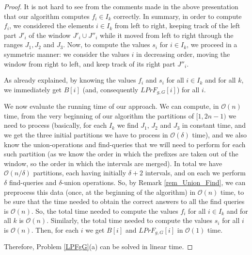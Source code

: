 \documentclass[final]{dmtcs-episciences}
\newcommand{\bigo}{{\mathcal O}}
\newcommand{\LPF}{{\mathit{LPrF}}}
\begin{document}
\begin{proof}
It is not hard to see from the comments made in the above presentation that our algorithm computes $f_i\in I_k$ correctly. In summary, in order to compute $f_i$, we considered the elements $i\in I_k$ from left to right, keeping track of the left part $J'_i$ of the window $J'_i\cup J''_i$ while it moved from left to right through the ranges $J_1,J_2$ and $J_3$. Now, to compute the values $s_i$ for $i\in I_k$, we proceed in a symmetric manner: we consider the values $i$ in decreasing order, moving the window from right to left, and keep track of its right part $J''_i$. 

As already explained, by knowing the values $f_i$ and $s_i$ for all $i\in I_k$ and for all $k$, we immediately get $B[i]$ (and, consequently $\LPF_{g,G}[i]$) for all $i$. 

We now evaluate the running time of our approach. We can compute, in $\bigo(n)$ time, from the very beginning of our algorithm the partitions of $[1,2n-1)$ we need to process (basically, for each $I_k$ we find $J_1$, $J_2$ and $J_3$ in constant time, and we get the three initial partitions we have to process in $\bigo(\delta)$ time), and we also know the union-operations and find-queries that we will need to perform for each such partition (as we know the order in which the prefixes are taken out of the window, so the order in which the intervals are merged). In total we have $\bigo(n/\delta)$ partitions, each having initially $\delta+2$ intervals, and on each we perform $\delta$ find-queries and $\delta$-union operations. So, by Remark \ref{rem_Union_Find}, we can preprocess this data (once, at the beginning of the algorithm) in $\bigo(n)$ time, to be sure that the time needed to obtain the correct answers to all the find queries is $\bigo(n)$. So, the total time needed to compute the values $f_i$ for all $i\in I_k$ and for all $k$ is $\bigo(n)$. Similarly, the total time needed to compute the values $s_i$ for all $i$ is $\bigo(n)$. Then, for each $i$ we get $B[i]$ and $\LPF_{g,G}[i]$ in $\bigo(1)$ time.

Therefore, Problem \ref{LPFgG}(a) can be solved in linear time.
\end{proof}
\end{document}
